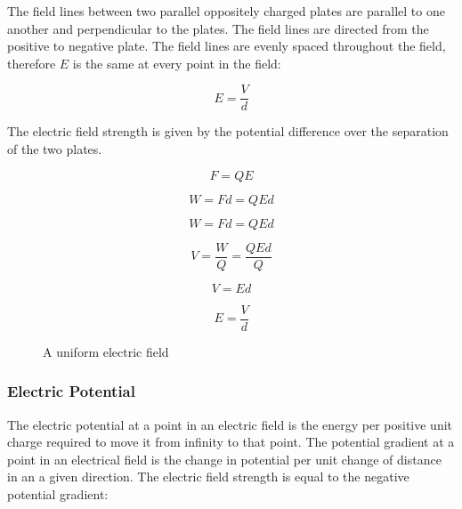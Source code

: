 \documentclass[12pt]{article}
\begin{document}
The field lines between two parallel oppositely charged plates are parallel to one another and perpendicular to the plates. The field lines are directed from the positive to negative plate. The field lines are evenly spaced throughout the field, therefore \(E\) is the same at every point in the field:

\[E = \dfrac{V}{d}\]

The electric field strength is given by the potential difference over the separation of the two plates.

\[F = QE\]

\[W = Fd = QEd\]

\[W = Fd = QEd\]

\[V = \dfrac{W}{Q} = \dfrac{QEd}{Q}\]

\[V = Ed\]

\[E = \frac{V}{d}\]

\begin{figure}[H]
\centering
{}
\caption{A uniform electric field}
\end{figure}

\subsubsection{Electric Potential}
\label{sec:orgd6cbf29}

The electric potential at a point in an electric field is the energy per positive unit charge required to move it from infinity to that point. The potential gradient at a point in an electrical field is the change in potential per unit change of distance in an a given direction. The electric field strength is equal to the negative potential gradient:
\end{document}
